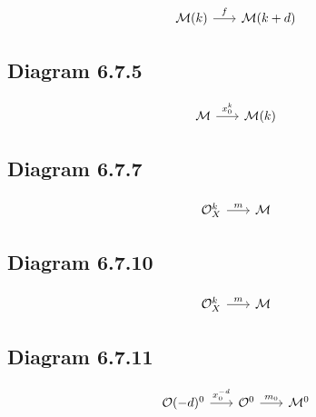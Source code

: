 \documentclass[leqno]{amsart}
\begin{document}
	\begin{equation*}
		\begin{tikzcd}[sep=scriptsize]
			\mathcal{M}(k) \arrow{r}{f} & \mathcal{M}(k+d)
		\end{tikzcd}
	\end{equation*}

	\subsection*{Diagram 6.7.5}

	\begin{equation*}
		\begin{tikzcd}[sep=scriptsize]
			\mathcal{M} \arrow{r}{x_{0}^{k}} & \mathcal{M}(k)
		\end{tikzcd}
	\end{equation*}

	\subsection*{Diagram 6.7.7}

	\begin{equation*}
		\begin{tikzcd}[sep=scriptsize]
			\mathcal{O}_{X}^{k} \arrow{r}{m} & \mathcal{M}
		\end{tikzcd}
	\end{equation*}

	\subsection*{Diagram 6.7.10}

	\begin{equation*}
		\begin{tikzcd}[sep=scriptsize]
			\mathcal{O}_{X}^{k} \arrow{r}{m} & \mathcal{M}
		\end{tikzcd}
	\end{equation*}


	\subsection*{Diagram 6.7.11}

	\begin{equation*}
		\begin{tikzcd}[sep=scriptsize]
			\mathcal{O}(-d)^0 \arrow{r}{x_{0}^{-d}} & \mathcal{O}^0 \arrow{r}{m_0} & \mathcal{M}^0
		\end{tikzcd}
	\end{equation*}
\end{document}
